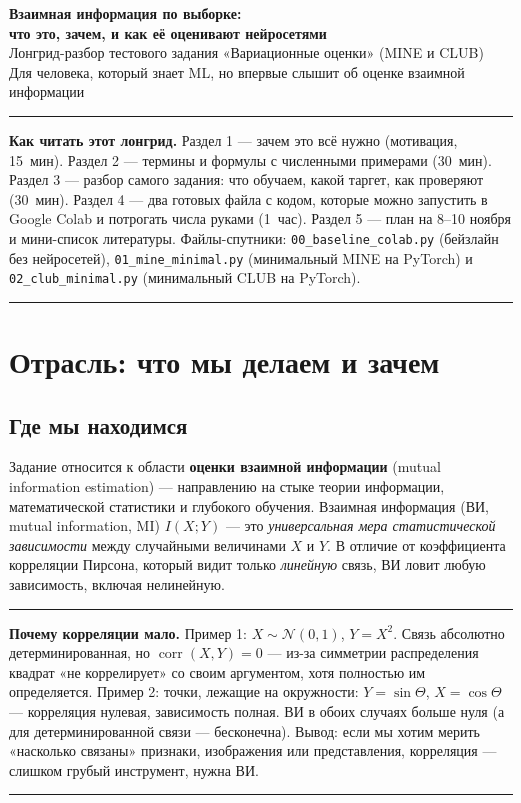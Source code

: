 \documentclass[11pt]{article}
\newcommand{\MI}{I(X;Y)}
\newenvironment{exbox}{%
  \par\medskip\noindent
  \begin{minipage}[t]{\linewidth}
  \color{accent}\rule[2pt]{\linewidth}{0.6pt}\color{black}
  \vspace{0.4em}\noindent\small
}{%
  \vspace{0.4em}
  \color{accent}\rule[2pt]{\linewidth}{0.6pt}\color{black}
  \end{minipage}\par\medskip
}
\begin{document}
\begin{center}
  {\LARGE\bfseries Взаимная информация по выборке:}\\[0.3em]
  {\LARGE\bfseries что это, зачем, и как её оценивают нейросетями}\\[0.8em]
  {\large Лонгрид-разбор тестового задания «Вариационные оценки» (MINE и CLUB)}\\[0.6em]
  {\normalsize\color{accent} Для человека, который знает ML, но впервые слышит об оценке взаимной информации}\\[1.2em]
\end{center}

\begin{exbox}
\textbf{Как читать этот лонгрид.} Раздел 1 — зачем это всё нужно (мотивация, 15~мин). Раздел 2 — термины и формулы с численными примерами (30~мин). Раздел 3 — разбор самого задания: что обучаем, какой таргет, как проверяют (30~мин). Раздел 4 — два готовых файла с кодом, которые можно запустить в Google Colab и потрогать числа руками (1~час). Раздел 5 — план на 8--10 ноября и мини-список литературы. Файлы-спутники: \texttt{00\_baseline\_colab.py} (бейзлайн без нейросетей), \texttt{01\_mine\_minimal.py} (минимальный MINE на PyTorch) и \texttt{02\_club\_minimal.py} (минимальный CLUB на PyTorch).
\end{exbox}

\tableofcontents

\section{Отрасль: что мы делаем и зачем}

\subsection{Где мы находимся}

Задание относится к области \textbf{оценки взаимной информации} (mutual information estimation) — направлению на стыке теории информации, математической статистики и глубокого обучения. Взаимная информация (ВИ, mutual information, MI) $\MI$ — это \emph{универсальная мера статистической зависимости} между случайными величинами $X$ и $Y$. В отличие от коэффициента корреляции Пирсона, который видит только \emph{линейную} связь, ВИ ловит любую зависимость, включая нелинейную.

\begin{exbox}
\textbf{Почему корреляции мало.} Пример 1: $X\sim\mathcal{N}(0,1)$, $Y=X^2$. Связь абсолютно детерминированная, но $\operatorname{corr}(X,Y)=0$ — из-за симметрии распределения квадрат «не коррелирует» со своим аргументом, хотя полностью им определяется. Пример 2: точки, лежащие на окружности: $Y=\sin\Theta$, $X=\cos\Theta$ — корреляция нулевая, зависимость полная. ВИ в обоих случаях больше нуля (а для детерминированной связи — бесконечна). Вывод: если мы хотим мерить «насколько связаны» признаки, изображения или представления, корреляция — слишком грубый инструмент, нужна ВИ.
\end{exbox}
\end{document}
